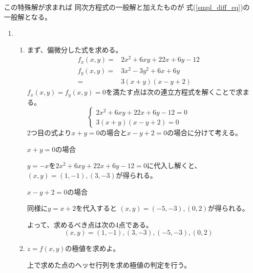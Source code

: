 \documentclass[12pt,b5paper]{ltjsarticle}
\begin{document}
この特殊解が求まれば
同次方程式の一般解と加えたものが
式(\ref{smpl_diff_eq})の一般解となる。







\newpage

\dotfill

\begin{enumerate}
 \item
\begin{enumerate}
 \item

%
%
%
%
%




まず、偏微分した式を求める。
\begin{align}
 f_x(x,y) =& 2x^2+6xy + 22x + 6y -12\\
 f_y(x,y) =& 3x^2 -3y^2 + 6x + 6y\\
 =& 3(x+y)(x-y+2)
\end{align}
$f_x(x,y) = f_y(x,y) = 0$を満たす点は次の連立方程式を解くことで求まる。
\begin{equation}
 \begin{cases}
  2x^2+6xy + 22x + 6y -12 = 0\\
  3(x+y)(x-y+2) = 0
 \end{cases}
\end{equation}
2つ目の式より$x+y=0$の場合と$x-y+2=0$の場合に分けて考える。

$x+y=0$の場合

$y=-x$を$2x^2+6xy + 22x + 6y -12 = 0$に代入し解くと、
$(x,y)=(1,-1),(3,-3)$が得られる。

$x-y+2=0$の場合

同様に$y=x+2$を代入すると
$(x,y)=(-5,-3),(0,2)$が得られる。

よって、求めるべき点は次の4点である。
\begin{equation}
 (x,y)=(1,-1),(3,-3),(-5,-3),(0,2)
\end{equation}


 \item
$z=f(x,y)$の極値を求めよ。

上で求めた点のヘッセ行列を求め極値の判定を行う。


\end{enumerate}
\end{enumerate}
\end{document}
